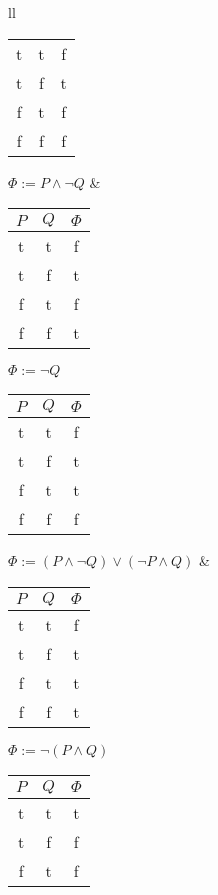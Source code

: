 \documentclass[leqno]{article}
\begin{document}
\begin{enumerate}
\begin{table}
\begin{tabular}{ll}
\begin{tabular}{|cc|c|}
        \hline
         t  &  t  &    f   \\
         t  &  f  &    t   \\
         f  &  t  &    f   \\
         f  &  f  &    f   \\
        \hline
      \end{tabular}
      \quad $\Phi := P \land \neg Q$
      &
      \begin{tabular}{|cc|c|}
        \hline
        $P$ & $Q$ & $\Phi$ \\
        \hline
         t  &  t  &    f   \\
         t  &  f  &    t   \\
         f  &  t  &    f   \\
         f  &  f  &    t   \\
        \hline
      \end{tabular}
      \quad $\Phi := \neg Q$
      \\
      \begin{tabular}{|cc|c|}
        \hline
        $P$ & $Q$ & $\Phi$ \\
        \hline
         t  &  t  &    f   \\
         t  &  f  &    t   \\
         f  &  t  &    t   \\
         f  &  f  &    f   \\
        \hline
      \end{tabular}
      \quad $\Phi := (P \land \neg Q) \lor (\neg P \land Q)$
      &
      \begin{tabular}{|cc|c|}
        \hline
        $P$ & $Q$ & $\Phi$ \\
        \hline
         t  &  t  &    f   \\
         t  &  f  &    t   \\
         f  &  t  &    t   \\
         f  &  f  &    t   \\
        \hline
      \end{tabular}
      \quad $\Phi := \neg (P \land Q)$
      \\
      \begin{tabular}{|cc|c|}
        \hline
        $P$ & $Q$ & $\Phi$ \\
        \hline
         t  &  t  &    t   \\
         t  &  f  &    f   \\
         f  &  t  &    f   \\

\end{tabular}
\end{tabular}
\end{table}
\end{enumerate}
\end{document}
